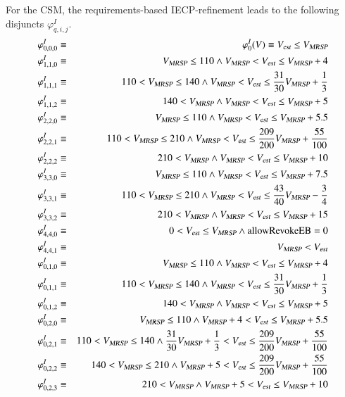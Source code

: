 \begin{example}
For the CSM, the requirements-based IECP-refinement leads to the following disjuncts $\varphi_{q,i,j}^I$.
\begin{eqnarray*}
\varphi_{0,0,0}^I & \equiv & \varphi_0^I(V)  \equiv \vest \le \vmax
\\
\varphi_{1,1,0}^I & \equiv & \vmax \le 110 \wedge   \vmax <  \vest \le \vmax +4
\\
\varphi_{1,1,1}^I & \equiv & 110<\vmax  \le 140  \wedge \vmax < \vest \le \frac{31}{30}\vmax +\frac{1}{3}
\\
\varphi_{1,1,2}^I & \equiv & 140<\vmax \wedge  \vmax < \vest \le \vmax +5
\\
\varphi_{2,2,0}^I & \equiv &  \vmax \le 110 \wedge  \vmax < \vest \le \vmax + 5.5
\\
\varphi_{2,2,1}^I & \equiv &  110 <\vmax  \le 210 \wedge 
\vmax < \vest \le\frac{209}{200}\vmax +\frac{55}{100}
\\
\varphi_{2,2,2}^I & \equiv & 210 < \vmax  \wedge  \vmax <  \vest \le\vmax + 10
\\
\varphi_{3,3,0}^I & \equiv &   \vmax \le 110 \wedge \vmax < \vest \le  \vmax + 7.5
\\
\varphi_{3,3,1}^I & \equiv &   110<\vmax  \le 210 \wedge  \vmax < \vest \le  \frac{43}{40}\vmax -\frac{3}{4}
\\
\varphi_{3,3,2}^I & \equiv &  210<\vmax   \wedge  \vmax < \vest \le  \vmax +15
\\ 
\varphi_{4,4,0}^I  & \equiv &  0 < \vest \le \vmax   \wedge \areb=0
\\ 
\varphi_{4,4,1}^I  & \equiv &  \vmax < \vest  
\\
\varphi_{0,1,0}^I &\equiv& \vmax \le 110 \wedge   \vmax < \vest \le \vmax +4
\\
\varphi_{0,1,1}^I &\equiv& 110<\vmax \le 140  \wedge \vmax < \vest \le \frac{31}{30}\vmax +\frac{1}{3} 
\\  
\varphi_{0,1,2}^I &\equiv& 140<\vmax \wedge  \vmax < \vest \le \vmax +5
\\
\varphi_{0,2,0}^I &\equiv& \vmax \le 110 \wedge \vmax +4 < \vest \le \vmax + 5.5
\\
\varphi_{0,2,1}^I &\equiv&  110 <\vmax  \le 140 \wedge \frac{31}{30}\vmax +\frac{1}{3} < \vest \le\frac{209}{200}\vmax +\frac{55}{100}
\\
\varphi_{0,2,2}^I &\equiv&  140 < \vmax \le 210 \wedge \vmax +5 < \vest \le\frac{209}{200}\vmax +\frac{55}{100}
\\
\varphi_{0,2,3}^I &\equiv&  210 < \vmax  \wedge  \vmax +5 < \vest \le\vmax + 10

\end{eqnarray*}
\end{example}
